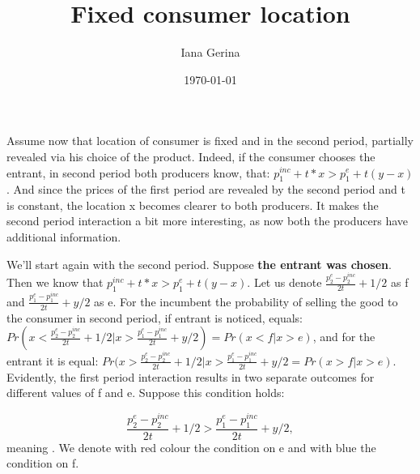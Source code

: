 \documentclass{article}
\title{Fixed consumer location}
\author{Iana Gerina}
\date{\today}
\begin{document}
\maketitle


Assume now that location of consumer is fixed and in the second period, partially revealed via his choice of the product. Indeed, if the consumer chooses the entrant, in second period both producers know, that:
$p_1^{inc}+t*x>p_1^{e}+t(y-x)$. And since the prices of the first period are revealed by the second period and t is constant, the location x becomes clearer to both producers. It makes the second period interaction a bit more interesting, as now both the producers have additional information. 

We'll start again with the second period. Suppose \textbf{the entrant was chosen}. Then we know that $p_1^{inc}+t*x>p_1^{e}+t(y-x)$. Let us denote $ \frac{p_2^{e}-p_2^{inc}}{2t}+1/2$ as f and $\frac{p_1^{e}-p_1^{inc}}{2t}+y/2$ as e. For the incumbent the probability of selling the good to the consumer in second period, if entrant is noticed, equals: $Pr(x<\frac{p_2^{e}-p_2^{inc}}{2t}+1/2 | x > \frac{p_1^{e}-p_1^{inc}}{2t}+y/2) = Pr(x<f|x>e)$, and for the entrant it is equal: $ Pr(x>\frac{p_2^{e}-p_2^{inc}}{2t}+1/2 | x >\frac{p_1^{e}-p_1^{inc}}{2t}+y/2 = Pr(x>f|x>e)$.
Evidently, the first period interaction results in two separate outcomes for different values of f and e. Suppose this condition holds:

$$ \frac{p_2^{e}-p_2^{inc}}{2t}+1/2 > \frac{p_1^{e}-p_1^{inc}}{2t}+y/2,$$
meaning . We denote with red colour the condition on e and with blue the condition on f. 
\end{document}
